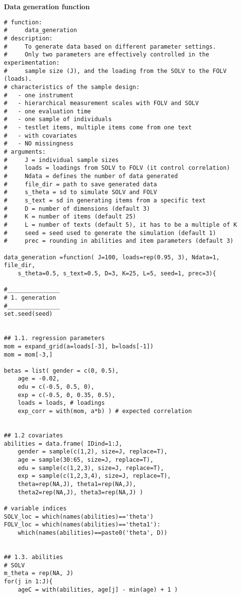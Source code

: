 \noindent \textbf{Data generation function}
%
\begin{lstlisting}
# function:
#     data_generation
# description:  
#     To generate data based on different parameter settings.
#     Only two parameters are effectively controlled in the experimentation: 
#     sample size (J), and the loading from the SOLV to the FOLV (loads).
# characteristics of the sample design:
#   - one instrument
#   - hierarchical measurement scales with FOLV and SOLV
#   - one evaluation time
#   - one sample of individuals
#   - testlet items, multiple items come from one text
#   - with covariates
#   - NO missingness
# arguments:
#     J = individual sample sizes
#     loads = loadings from SOLV to FOLV (it control correlation)
#     Ndata = defines the number of data generated
#     file_dir = path to save generated data
#     s_theta = sd to simulate SOLV and FOLV
#     s_text = sd in generating items from a specific text
#     D = number of dimensions (default 3)
#     K = number of items (default 25)
#     L = number of texts (default 5), it has to be a multiple of K
#     seed = seed used to generate the simulation (default 1)
#     prec = rounding in abilities and item parameters (default 3)
	
data_generation =function( J=100, loads=rep(0.95, 3), Ndata=1, file_dir,
	s_theta=0.5, s_text=0.5, D=3, K=25, L=5, seed=1, prec=3){
		
#_______________
# 1. generation 
#_______________
set.seed(seed)
		
	
## 1.1. regression parameters
mom = expand_grid(a=loads[-3], b=loads[-1])
mom = mom[-3,]
		
betas = list( gender = c(0, 0.5),
	age = -0.02,
	edu = c(-0.5, 0.5, 0),
	exp = c(-0.5, 0, 0.35, 0.5),
	loads = loads, # loadings
	exp_corr = with(mom, a*b) ) # expected correlation
		
		
## 1.2 covariates
abilities = data.frame( IDind=1:J,
	gender = sample(c(1,2), size=J, replace=T),
	age = sample(30:65, size=J, replace=T),
	edu = sample(c(1,2,3), size=J, replace=T),
	exp = sample(c(1,2,3,4), size=J, replace=T),
	theta=rep(NA,J), theta1=rep(NA,J), 
	theta2=rep(NA,J), theta3=rep(NA,J) )
	
# variable indices
SOLV_loc = which(names(abilities)=='theta')
FOLV_loc = which(names(abilities)=='theta1'):
	which(names(abilities)==paste0('theta', D))
		
		
## 1.3. abilities
# SOLV
m_theta = rep(NA, J)
for(j in 1:J){
	ageC = with(abilities, age[j] - min(age) + 1 )
	

\end{lstlisting}
